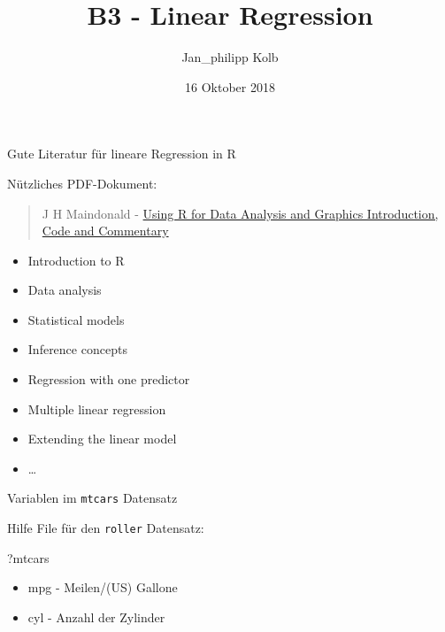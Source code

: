 \documentclass[ignorenonframetext,]{beamer}
\title{B3 - Linear Regression}
\author{Jan\_philipp Kolb}
\date{16 Oktober 2018}
\newenvironment{Shaded}{\begin{snugshade}}{\end{snugshade}}
\newcommand{\NormalTok}[1]{#1}
\providecommand{\tightlist}{%
  \setlength{\itemsep}{0pt}\setlength{\parskip}{0pt}}
\begin{document}
\frame{\titlepage}

\begin{frame}{Gute Literatur für lineare Regression in R}
\protect\hypertarget{gute-literatur-fur-lineare-regression-in-r}{}

\begin{block}{Nützliches PDF-Dokument:}

\begin{quote}
J H Maindonald -
\href{https://cran.r-project.org/doc/contrib/usingR.pdf}{Using R for
Data Analysis and Graphics Introduction, Code and Commentary}
\end{quote}

\begin{itemize}
\tightlist
\item
  Introduction to R
\item
  Data analysis
\item
  Statistical models
\item
  Inference concepts
\item
  Regression with one predictor
\item
  Multiple linear regression
\item
  Extending the linear model
\item
  \ldots{}
\end{itemize}

\end{block}

\end{frame}

\begin{frame}[fragile]{Variablen im \texttt{mtcars} Datensatz}
\protect\hypertarget{variablen-im-mtcars-datensatz}{}

Hilfe File für den \texttt{roller} Datensatz:

\begin{Shaded}
\begin{Highlighting}[]
\NormalTok{?mtcars}
\end{Highlighting}
\end{Shaded}

\begin{itemize}
\tightlist
\item
  mpg - Meilen/(US) Gallone
\item
  cyl - Anzahl der Zylinder
\end{itemize}

\end{frame}
\end{document}
